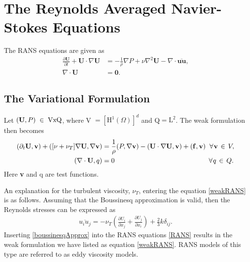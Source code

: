 \documentclass[11pt]{article}
\begin{document}
{%
\section{The Reynolds Averaged Navier-Stokes Equations}
The RANS equations are given as 
\begin{align}
\label{RANS}
\frac{\partial \mathbf{U}}{\partial t} + \mathbf{U}\cdot\nabla\mathbf{U} &= -\frac{1}{\rho}\nabla P + 
\nu\nabla^2 \mathbf{U} - \nabla\cdot \overline{\mathbf{uu}}, \\
\label{RANScontinuity}
\nabla \cdot\mathbf{U} &= \mathbf{0}.
\end{align}

\subsection{The Variational Formulation}
Let $(\mathbf{U},P)\hspace{1mm}\in\hspace{1mm} \text{VxQ}$, where V 
$= [\text{H}^1(\Omega)]^d$ and Q$=\text{L}^2$. The weak formulation then becomes
\begin{align}  
\label{weakRANS}
(\partial_t \mathbf{U},\mathbf{v}) + \left([\nu + \nu_T] \nabla \mathbf{U}, \nabla\mathbf{v} \right) &=
\frac{1}{\rho}(P,\nabla\mathbf{v}) - (\mathbf{U}\cdot\nabla\mathbf{U},\mathbf{v}) + (\mathbf{f},\mathbf{v})  
\hspace{2mm}\forall \hspace{0.25mm}\mathbf{v} \hspace{0.5mm}\in \hspace{0.5mm} V,  \\
\label{weakRANSContinuity}
(\nabla \cdot\mathbf{U},q) &= 0  \hspace{49mm}\forall \hspace{0.25mm}q \hspace{0.5mm}\in 
\hspace{0.5mm} Q. 
\end{align}
Here \textbf{v} and q are test functions.

An explanation for the turbulent viscosity, $\nu_T$, entering the equation \eqref{weakRANS} is 
as follows. Assuming that the Boussinesq approximation is valid, then the Reynolds stresses can
be expressed as 
\begin{align}
\label{boussinesqApprox}
\overline{u_iu_j} = -\nu_T \left(\frac{\partial U_i}{\partial x_j} + \frac{\partial U_j}{\partial x_i} \right) 
+ \frac{2}{3} k \delta_{ij}.
\end{align}
Inserting \eqref{boussinesqApprox} into the RANS equations \eqref{RANS} results in the weak
formulation we have listed as equation \eqref{weakRANS}. RANS models of this type are referred 
to as eddy viscosity models.



}
\end{document}
